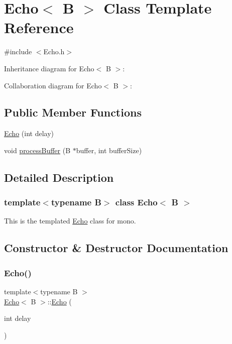 \hypertarget{classEcho}{}\section{Echo$<$ B $>$ Class Template Reference}
\label{classEcho}


{\ttfamily \#include $<$Echo.\+h$>$}



Inheritance diagram for Echo$<$ B $>$\+:


Collaboration diagram for Echo$<$ B $>$\+:
\subsection*{Public Member Functions}
\begin{DoxyCompactItemize}
\item 
\hyperlink{classEcho_a8a55bd3139585bc7cb63d5c6bde8a2d7}{Echo} (int delay)
\item 
void \hyperlink{classEcho_aed7d72d9f86cd0823dea92d49245ac17}{process\+Buffer} (B $\ast$buffer, int buffer\+Size)
\end{DoxyCompactItemize}


\subsection{Detailed Description}
\subsubsection*{template$<$typename B$>$\newline
class Echo$<$ B $>$}

This is the templated \hyperlink{classEcho}{Echo} class for mono. 

\subsection{Constructor \& Destructor Documentation}
\mbox{\label{classEcho_a8a55bd3139585bc7cb63d5c6bde8a2d7}} 
\subsubsection{\texorpdfstring{Echo()}{Echo()}}
{\footnotesize\ttfamily template$<$typename B $>$ \\
\hyperlink{classEcho}{Echo}$<$ B $>$\+::\hyperlink{classEcho}{Echo} (\begin{DoxyParamCaption}\item[{int}]{delay }\end{DoxyParamCaption})}


